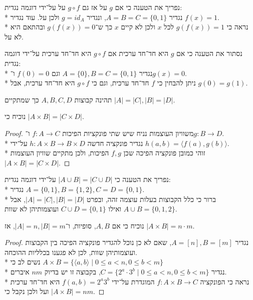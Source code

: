 \Subquestion{}
נפריך את הטענה כי אם $g$ על אז גם $g \circ f$ על על־ידי דוגמה נגדית: \\*
נגדיר $A = B = C = \{0, 1\}$, ונגדיר $g = id_A$ ולכן על. עוד נגדיר $f(x) = 1$. \\*
נראה כי $g(f(x)) = 1$ לכל $x$ ולכן לא קיים $x$ כך ש־$g(f(x)) = 0$ ובהתאם היא לא על.

\Subquestion{}
נסתור את הטענה כי אם $g$ היא חד־חד ערכית אם $g \circ f$ היא חד־חד ערכית על־ידי דוגמה נגדית: \\*
נגדיר $A = \{0\}, B = C = \{0, 1\}$ וגם $f(0) = 0$ ו־$g(x) = 0$. \\*
ניתן להבחין כי $f$ חד־חד ערכית, וגם כי $g \circ f$ היא חד־חד ערכית, אבל $g(0) = g(1)$.

\Question{}
תהינה קבוצות $A, B, C, D$ כך שמתקיים $|A| = |C|, |B| = |D|$.

\Subquestion{}
נוכיח כי $|A \times B| = |C \times D|$.
\begin{proof}
	משוויון העוצמות נניח שיש שתי פונקציות הפיכות $f : A \to C$ ו־$g : B \to D$. \\*
	נגדיר פונקציה חדשה $h : A \times B \to B \times D$ על־ידי $h(a, b) = \langle f(a), g(b) \rangle$. \\*
	זוהי כמובן פונקציה הפיכה שכן $f, g$ הפיכות, ולכן מתקיים שוויון העוצמות $|A \times B| = |C \times D|$.
\end{proof}

\Subquestion{}
נפריך את הטענה כי $|A \cup B| = |C \cup D|$ על־ידי דוגמה נגדית: \\*
נגדיר $A = \{0, 1\}, B = \{1, 2\}, C = D = \{0, 1\}$. \\*
ברור כי כלל הקבוצות בעלות עוצמה זהה, ובפרט $|A| = |C|, |B| = |D|$, אבל $A \cup B = \{0, 1, 2\}$ ואילו $C \cup D = \{0, 1\}$ ועוצמותיהן לא שוות.

\Question{}
נוכיח כי אם $A, B$, סופיות, ו־$|A| = n, |B| = m$, אז $|A \times B| = n \cdot m$.
\begin{proof}
	נגדיר $A = [n], B = [m]$, שאם לא כן נוכל להגדיר פונקציה הפיכה בין הקבוצות ועוצמותיהן שוות, לכן לא פגענו בכלליות ההוכחה. \\*
	נשים לב כי $A \times B = \{ \langle a, b \rangle \mid 0 \le a < n, 0 \le b < m \}$ \\*
	נגדיר $C = \{ 2^a \cdot 3^b \mid 0 \le a < n, 0 \le b < m \}$, בקבוצה זו יש בדיוק $nm$ איברים. \\*
	נראה כי הפונקציה $f : A \times B \to C$ המוגדרת על־ידי $f(a, b) = 2^a 3^b$ היא חד־חד ערכית ועל ולכן נקבל כי $|A \times B| = nm$.
\end{proof}

